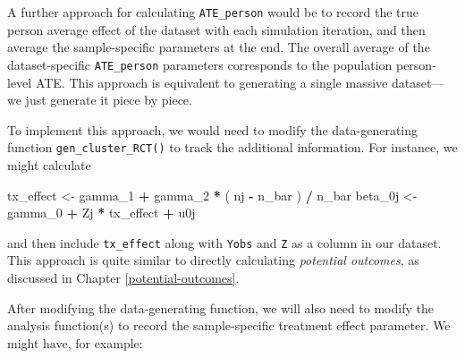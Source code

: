 \documentclass[
]{book}
\newenvironment{Shaded}{\begin{snugshade}}{\end{snugshade}}
\newcommand{\AttributeTok}[1]{\textcolor[rgb]{0.13,0.29,0.53}{#1}}
\newcommand{\ControlFlowTok}[1]{\textcolor[rgb]{0.13,0.29,0.53}{\textbf{#1}}}
\newcommand{\FunctionTok}[1]{\textcolor[rgb]{0.13,0.29,0.53}{\textbf{#1}}}
\newcommand{\NormalTok}[1]{#1}
\newcommand{\OtherTok}[1]{\textcolor[rgb]{0.56,0.35,0.01}{#1}}
\newcommand{\SpecialCharTok}[1]{\textcolor[rgb]{0.81,0.36,0.00}{\textbf{#1}}}
\newcommand{\StringTok}[1]{\textcolor[rgb]{0.31,0.60,0.02}{#1}}
\begin{document}
A further approach for calculating \texttt{ATE\_person} would be to record the true person average effect of the dataset with each simulation iteration, and then average the sample-specific parameters at the end.
The overall average of the dataset-specific \texttt{ATE\_person} parameters corresponds to the population person-level ATE.
This approach is equivalent to generating a single massive dataset---we just generate it piece by piece.

To implement this approach, we would need to modify the data-generating function \texttt{gen\_cluster\_RCT()} to track the additional information.
For instance, we might calculate

\begin{Shaded}
\begin{Highlighting}[]
\NormalTok{tx\_effect }\OtherTok{\textless{}{-}}\NormalTok{ gamma\_1 }\SpecialCharTok{+}\NormalTok{ gamma\_2 }\SpecialCharTok{*}\NormalTok{ ( nj }\SpecialCharTok{{-}}\NormalTok{ n\_bar ) }\SpecialCharTok{/}\NormalTok{ n\_bar}
\NormalTok{beta\_0j }\OtherTok{\textless{}{-}}\NormalTok{ gamma\_0 }\SpecialCharTok{+}\NormalTok{ Zj }\SpecialCharTok{*}\NormalTok{ tx\_effect }\SpecialCharTok{+}\NormalTok{ u0j}
\end{Highlighting}
\end{Shaded}

and then include \texttt{tx\_effect} along with \texttt{Yobs} and \texttt{Z} as a column in our dataset.
This approach is quite similar to directly calculating \emph{potential outcomes}, as discussed in Chapter \ref{potential-outcomes}.

After modifying the data-generating function, we will also need to modify the analysis function(s) to record the sample-specific treatment effect parameter.
We might have, for example:

\begin{Shaded}
\end{Shaded}
\end{document}

